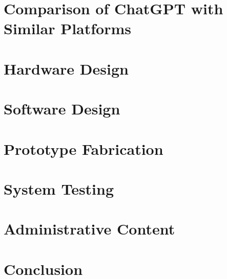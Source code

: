 \documentclass[12pt, letterpaper]{article}
\begin{document}
\begin{singlespace}
		\newpage
		\section{Comparison of ChatGPT with Similar Platforms}
		
		
		\newpage
		\section{Hardware Design}
		
		
		
		
		
		\newpage
		\section{Software Design}
		
		
		
		
		
		\newpage
		\section{Prototype Fabrication}
		
		
		\newpage
		\section{System Testing}
		
		
		\newpage
		\section{Administrative Content}
		
		
			
		\newpage
		\section{Conclusion}
		
		\newpage

\end{singlespace}
\end{document}

